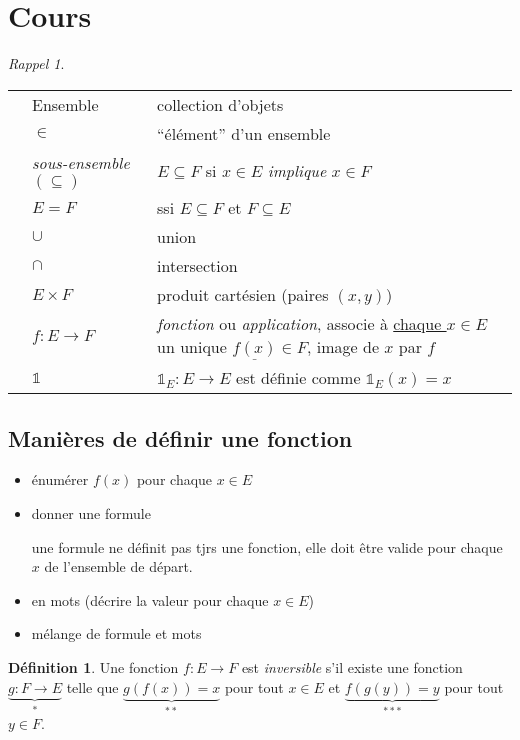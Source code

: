\documentclass{report}
\newcounter{cours}
\newcommand*{\cours}{\section*{Cours \thecours}\stepcounter{cours}}
\theoremstyle{definition}
\newtheorem*{defin}{D\'efinition}
\theoremstyle{remark}
\newtheorem*{rappel}{Rappel}
\begin{document}
	\cours
	\begin{rappel}
		~

		\begin{tabularx}{.9\textwidth}{cl>{\raggedright\arraybackslash}X}
			\textbullet&Ensemble&collection d'objets\\
			\textbullet&$\in$&``\'el\'ement'' d'un ensemble\\
			\textbullet&\emph{sous-ensemble} $(\subseteq)$&$E \subseteq F$ si $x \in E$ \emph{implique} $x \in F$\\
			\textbullet&$E=F$&ssi $E \subseteq F$ et $F \subseteq E$\\
			\textbullet&$\cup$&union\\
			&$\cap$&intersection\\
			\textbullet&$E \times F$&produit cart\'esien (paires $(x,y)$)\\
			\textbullet&$f:E \to F$&\emph{fonction} ou \emph{application}, associe \`a \underline{chaque $x \in E$} un unique $\underline{f(x)} \in F$, image de $x$ par $f$\\
			\textbullet&$\mathds{1}$&$\mathds{1}_E:E \to E$ est d\'efinie comme $\mathds{1}_E(x)=x$
		\end{tabularx}
	\end{rappel}


	\subsection{Mani\`eres de d\'efinir une fonction}
	\begin{itemize}[noitemsep]
		\item \'enum\'erer $f(x)$ pour chaque $x \in E$
		\item donner une formule

		une formule ne d\'efinit pas tjrs une fonction, elle doit \^etre valide pour chaque $x$ de l'ensemble de d\'epart.
		\item en mots (d\'ecrire la valeur pour chaque $x \in E$)
		\item m\'elange de formule et mots
	\end{itemize}

	\begin{defin}
		Une fonction $f:E \to F$ est \emph{inversible} s'il existe une fonction $\underbrace{g:F \to E}_{*}$ telle que $\underbrace{g(f(x))=x}_{**}$ pour tout $x \in E$ et $\underbrace{f(g(y))=y}_{***}$ pour tout $y \in F$.
	\end{defin}
\end{document}
